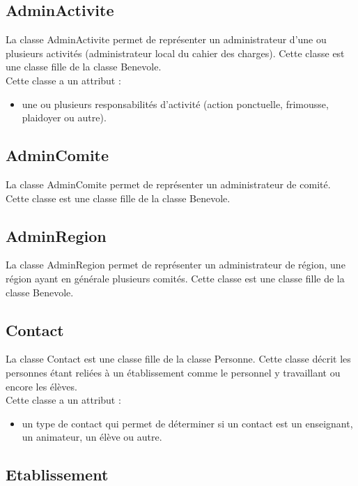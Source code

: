 \documentclass[asi, sansVersion]{picInsa}
\begin{document}
\subsection*{AdminActivite}

La classe AdminActivite permet de représenter un administrateur d'une ou plusieurs activités (administrateur local du cahier des charges). Cette classe est une classe fille de la classe Benevole.\\
Cette classe a un attribut :
\begin{itemize}
\item une ou plusieurs responsabilités d'activité (action ponctuelle, frimousse, plaidoyer ou autre). 
\end{itemize}

\subsection*{AdminComite}

La classe AdminComite permet de représenter un administrateur de comité. Cette classe est une classe fille de la classe Benevole. 

\subsection*{AdminRegion}

La classe AdminRegion permet de représenter un administrateur de région, une région ayant en générale plusieurs comités. Cette classe est une classe fille de la classe Benevole. 

\subsection*{Contact}

La classe Contact est une classe fille de la classe Personne. Cette classe décrit les personnes étant reliées à un établissement comme le personnel y travaillant ou encore les élèves. \\
Cette classe a un attribut : 
\begin{itemize}
\item un type de contact qui permet de déterminer si un contact est un enseignant, un animateur, un élève ou autre.
\end{itemize} 


\subsection*{Etablissement}
\end{document}
